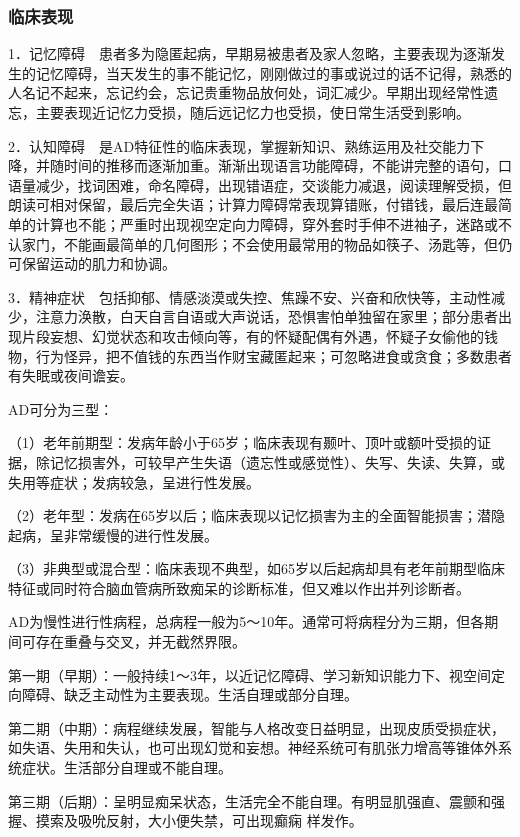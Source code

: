 \subsubsection{临床表现}

1．记忆障碍　患者多为隐匿起病，早期易被患者及家人忽略，主要表现为逐渐发生的记忆障碍，当天发生的事不能记忆，刚刚做过的事或说过的话不记得，熟悉的人名记不起来，忘记约会，忘记贵重物品放何处，词汇减少。早期出现经常性遗忘，主要表现近记忆力受损，随后远记忆力也受损，使日常生活受到影响。

2．认知障碍　是AD特征性的临床表现，掌握新知识、熟练运用及社交能力下降，并随时间的推移而逐渐加重。渐渐出现语言功能障碍，不能讲完整的语句，口语量减少，找词困难，命名障碍，出现错语症，交谈能力减退，阅读理解受损，但朗读可相对保留，最后完全失语；计算力障碍常表现算错账，付错钱，最后连最简单的计算也不能；严重时出现视空定向力障碍，穿外套时手伸不进袖子，迷路或不认家门，不能画最简单的几何图形；不会使用最常用的物品如筷子、汤匙等，但仍可保留运动的肌力和协调。

3．精神症状　包括抑郁、情感淡漠或失控、焦躁不安、兴奋和欣快等，主动性减少，注意力涣散，白天自言自语或大声说话，恐惧害怕单独留在家里；部分患者出现片段妄想、幻觉状态和攻击倾向等，有的怀疑配偶有外遇，怀疑子女偷他的钱物，行为怪异，把不值钱的东西当作财宝藏匿起来；可忽略进食或贪食；多数患者有失眠或夜间谵妄。

AD可分为三型：

（1）老年前期型：发病年龄小于65岁；临床表现有颞叶、顶叶或额叶受损的证据，除记忆损害外，可较早产生失语（遗忘性或感觉性）、失写、失读、失算，或失用等症状；发病较急，呈进行性发展。

（2）老年型：发病在65岁以后；临床表现以记忆损害为主的全面智能损害；潜隐起病，呈非常缓慢的进行性发展。

（3）非典型或混合型：临床表现不典型，如65岁以后起病却具有老年前期型临床特征或同时符合脑血管病所致痴呆的诊断标准，但又难以作出并列诊断者。

AD为慢性进行性病程，总病程一般为5～10年。通常可将病程分为三期，但各期间可存在重叠与交叉，并无截然界限。

第一期（早期）：一般持续1～3年，以近记忆障碍、学习新知识能力下、视空间定向障碍、缺乏主动性为主要表现。生活自理或部分自理。

第二期（中期）：病程继续发展，智能与人格改变日益明显，出现皮质受损症状，如失语、失用和失认，也可出现幻觉和妄想。神经系统可有肌张力增高等锥体外系统症状。生活部分自理或不能自理。

第三期（后期）：呈明显痴呆状态，生活完全不能自理。有明显肌强直、震颤和强握、摸索及吸吮反射，大小便失禁，可出现癫痫
样发作。

